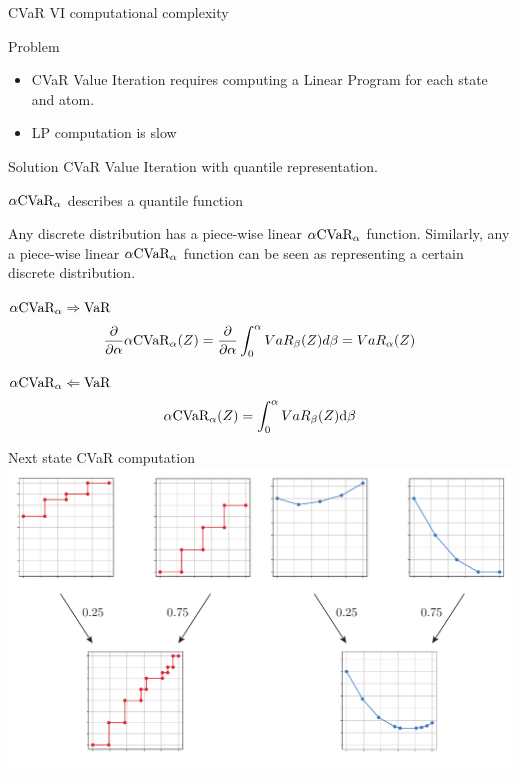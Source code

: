 \documentclass{beamer}
\begin{document}

\begin{frame}{CVaR VI computational complexity}
\begin{alertblock}{Problem}
\begin{itemize}
\item CVaR Value Iteration requires computing a Linear Program for each state and atom.
\item LP computation is slow
\end{itemize}
\end{alertblock}

\bigskip
\begin{exampleblock}{Solution}
CVaR Value Iteration with quantile representation.
\end{exampleblock}
\end{frame}


\begin{frame}{$\alpha\text{CVaR}_\alpha$ describes a quantile function}
\begin{lemma}
Any discrete distribution has a piece-wise linear $\alpha\text{CVaR}_\alpha$ function. Similarly, any a piece-wise linear $\alpha\text{CVaR}_\alpha$ function can be seen as representing a certain discrete distribution.
\end{lemma}

\begin{block}{$\alpha\text{CVaR}_\alpha 	\Rightarrow\text{VaR}$}
$$\dfrac{\partial}{\partial \alpha} \alpha \text{CVaR}_\alpha(Z) = \dfrac{\partial}{\partial \alpha} \int_0^\alpha VaR_\beta(Z) d\beta = VaR_\alpha(Z)$$
\end{block}


\begin{block}{$\alpha\text{CVaR}_\alpha \Leftarrow  \text{VaR}$}
$$\alpha \text{CVaR}_\alpha(Z) = \int_0^\alpha VaR_\beta(Z) \text{d} \beta$$
\end{block}

\end{frame}


\begin{frame}{Next state CVaR computation}
\center
\includegraphics[width=\linewidth]{../gfx/multivarvar.pdf}
\end{frame}
\end{document}
